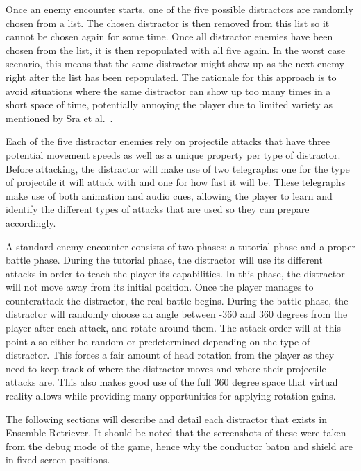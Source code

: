 Once an enemy encounter starts, one of the five possible distractors are randomly chosen from a list. The chosen distractor is then removed from this list so it cannot be chosen again for some time. Once all distractor enemies have been chosen from the list, it is then repopulated with all five again. In the worst case scenario, this means that the same distractor might show up as the next enemy right after the list has been repopulated. The rationale for this approach is to avoid situations where the same distractor can show up too many times in a short space of time, potentially annoying the player due to limited variety as mentioned by Sra et al.~\cite{sra2018vmotion}. 

Each of the five distractor enemies rely on projectile attacks that have three potential movement speeds as well as a unique property per type of distractor. Before attacking, the distractor will make use of two telegraphs: one for the type of projectile it will attack with and one for how fast it will be. These telegraphs make use of both animation and audio cues, allowing the player to learn and identify the different types of attacks that are used so they can prepare accordingly. 

A standard enemy encounter consists of two phases: a tutorial phase and a proper battle phase. During the tutorial phase, the distractor will use its different attacks in order to teach the player its capabilities. In this phase, the distractor will not move away from its initial position. Once the player manages to counterattack the distractor, the real battle begins. During the battle phase, the distractor will randomly choose an angle between -360 and 360 degrees from the player after each attack, and rotate around them. The attack order will at this point also either be random or predetermined depending on the type of distractor. This forces a fair amount of head rotation from the player as they need to keep track of where the distractor moves and where their projectile attacks are. This also makes good use of the full 360 degree space that virtual reality allows while providing many opportunities for applying rotation gains.    

The following sections will describe and detail each distractor that exists in Ensemble Retriever. It should be noted that the screenshots of these were taken from the debug mode of the game, hence why the conductor baton and shield are in fixed screen positions.

